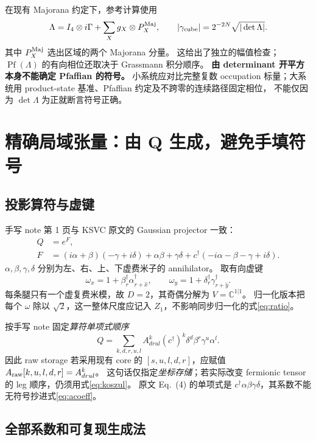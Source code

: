 \documentclass[11pt]{article}
\newcommand{\Pf}{\operatorname{Pf}}
\begin{document}
在现有 Majorana 约定下，参考计算使用
\begin{equation}
 \Lambda=I_4\otimes i\Gamma+\sum_X g_X\otimes P_X^{\rm Maj},\qquad
 |\gamma_{\rm cube}|=2^{-2N}\sqrt{|\det\Lambda|}.
 \label{eq:pf}
\end{equation}
其中 $P_X^{\rm Maj}$ 选出区域的两个 Majorana 分量。
这给出了独立的幅值检查；$\Pf(\Lambda)$ 的有向相位还取决于 Grassmann 积分顺序。
\textbf{由 determinant 开平方本身不能确定 Pfaffian 的符号。}
小系统应对比完整复数 occupation 标量；大系统用 product-state 基准、Pfaffian 约定及不跨零的连续路径固定相位，
不能仅因为 $\det\Lambda$ 为正就断言符号正确。

\section{精确局域张量：由 Q 生成，避免手填符号}
\subsection{投影算符与虚键}

手写 note 第 1 页与 KSVC 原文\cite{ksvc}的 Gaussian projector 一致：
\begin{align}
 Q&=e^F,\nonumber\\
 F&=(i\alpha+\beta)(-\gamma+i\delta)+\alpha\beta+\gamma\delta
       +c^\dagger(-i\alpha-\beta-\gamma+i\delta).\label{eq:q}
\end{align}
$\alpha,\beta,\gamma,\delta$ 分别为左、右、上、下虚费米子的 annihilator。
取有向虚键
\begin{equation}
 \omega_x=1+\beta_r^\dagger\alpha_{r+\hat x}^\dagger,\qquad
 \omega_y=1+\delta_r^\dagger\gamma_{r+\hat y}^\dagger.\label{eq:bond}
\end{equation}
每条腿只有一个虚复费米模，故 $D=2$，其奇偶分解为 $V=\mathbb C^{1|1}$。
归一化版本把每个 $\omega$ 除以 $\sqrt2$，这一整体尺度应记入 $Z_1$，不影响同步归一化的式\eqref{eq:ratio}。

按手写 note 固定\emph{算符单项式顺序}
\begin{equation}
 Q=\sum_{k,d,r,u,l} A^k_{drul}
 (c^\dagger)^k\delta^d\beta^r\gamma^u\alpha^l.
 \label{eq:acoeff}
\end{equation}
因此 raw storage 若采用现有 core 的 $[s,u,l,d,r]$，应赋值
$A_{\rm raw}[k,u,l,d,r]=A^k_{drul}$。
这句话仅指定\emph{坐标存储}；若实际改变 fermionic tensor 的 leg 顺序，仍须用式\eqref{eq:koszul}。
原文 Eq.~(4) 的单项式是 $c^\dagger\alpha\beta\gamma\delta$，其系数不能无符号抄进式\eqref{eq:acoeff}。

\subsection{全部系数和可复现生成法}
\end{document}
